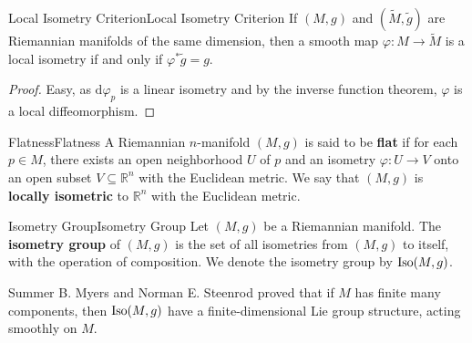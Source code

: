 \documentclass[../main.tex]{subfiles}
\begin{document}
\begin{proposition}{Local Isometry Criterion}{Local Isometry Criterion}
	If $(M, g)$ and $(\tilde{M}, \tilde{g})$ are Riemannian manifolds of the same dimension, then a smooth map $\varphi: M \to \tilde{M}$ is a local isometry if and only if $\varphi^*\tilde{g} = g$.
\end{proposition}
\begin{proof}
	Easy, as $\mathrm{d} \varphi_p$ is a linear isometry and by the inverse function theorem, $\varphi$ is a local diffeomorphism.
\end{proof}

\begin{definition}{Flatness}{Flatness}
	A Riemannian $n$-manifold $(M, g)$ is said to be \textbf{flat} if for each $p \in M$, there exists an open neighborhood $U$ of $p$ and an isometry $\varphi: U \to V$ onto an open subset $V \subseteq \mathbb{R}^n$ with the Euclidean metric. We say that $(M, g)$ is \textbf{locally isometric} to $\mathbb{R}^n$ with the Euclidean metric.
\end{definition}

\begin{definition}{Isometry Group}{Isometry Group}
	Let $(M, g)$ be a Riemannian manifold. The \textbf{isometry group} of $(M, g)$ is the set of all isometries from $(M, g)$ to itself, with the operation of composition. We denote the isometry group by $\operatorname{Iso}(M, g)$.
\end{definition}

\begin{remark}
	Summer B. Myers and Norman E. Steenrod proved that if $M$ has finite many components, then $\operatorname{Iso}(M, g)$ have a finite-dimensional Lie group structure, acting smoothly on $M$.
\end{remark}
\end{document}
